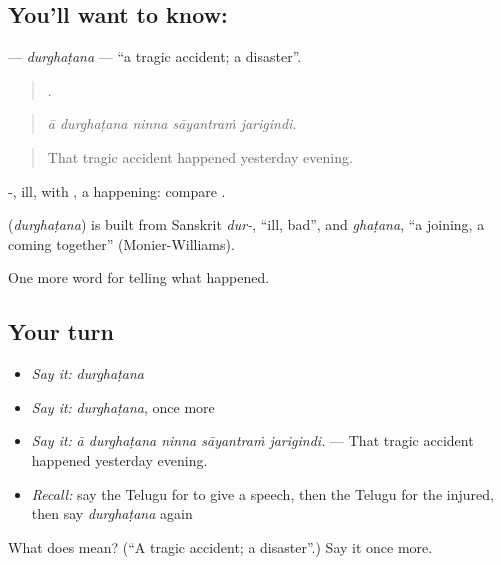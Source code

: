 \subsection*{You'll want to know: }
\textbf{} — \emph{durghaṭana} — \textquotedblleft{}a tragic accident; a disaster\textquotedblright{}.

\begin{quote}
    .
\end{quote}

\begin{quote}
\emph{ā durghaṭana ninna sāyantraṁ jarigindi.}
\end{quote}

\begin{quote}
That tragic accident happened yesterday evening.
\end{quote}

-, ill, with , a happening: compare .

\begin{cousinweb}
\textbf{} (\emph{durghaṭana}) is built from Sanskrit \emph{dur-}, \textquotedblleft{}ill, bad\textquotedblright{}, and \emph{ghaṭana}, \textquotedblleft{}a joining, a coming together\textquotedblright{} (Monier-Williams).
\end{cousinweb}

\begin{grammarlens}[title={What you've built}]
One more word for telling what happened.
\end{grammarlens}

\subsection*{Your turn}
\begin{itemize}
\raggedright
  \item \emph{Say it:} \emph{durghaṭana}
  \item \emph{Say it:} \emph{durghaṭana}, once more
  \item \emph{Say it:} \emph{ā durghaṭana ninna sāyantraṁ jarigindi.} — That tragic accident happened yesterday evening.
  \item \emph{Recall:} say the Telugu for to give a speech, then the Telugu for the injured, then say \emph{durghaṭana} again
\end{itemize}

\begin{tcolorbox}[breakable,colback=teal!4,colframe=teal!35!black,title={Before you move on}]
What does  mean? (\textquotedblleft{}A tragic accident; a disaster\textquotedblright{}.) Say it once more.
\end{tcolorbox}
